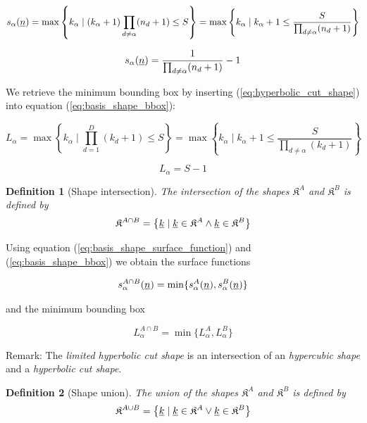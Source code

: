 \documentclass{article}
\newtheorem{definition}{Definition}
\begin{document}
\[
  s_{\alpha}(\underline{n})=
  \max\left\{k_{\alpha} \mid (k_{\alpha}+1)\prod_{d \neq \alpha} (n_d+1) \leq S \right\} =
  \max\left\{k_{\alpha} \mid k_{\alpha}+1 \leq \frac{S}{\prod_{d \neq \alpha}(n_d+1)}\right\}
\]

\begin{equation}
s_{\alpha}(\underline{n})=\frac{1}{\prod_{d \neq \alpha} (n_d+1)}-1
\end{equation}

We retrieve the minimum bounding box by inserting (\ref{eq:hyperbolic_cut_shape}) into
equation (\ref{eq:basis_shape_bbox}):

\[
  L_{\alpha}=\max\left\{k_{\alpha} \mid \prod_{d=1}^D(k_d+1) \leq S\right\} =
  \max\left\{k_{\alpha} \mid k_{\alpha}+1 \leq \frac{S}{\prod_{d \neq \alpha}(k_d+1)}\right\}
\]

\begin{equation}
L_{\alpha}=S-1
\end{equation}

\begin{definition}[Shape intersection]
  The intersection of the shapes \(\mathfrak{K}^{A}\) and \(\mathfrak{K}^{B}\) is defined by
  \begin{equation}
    \label{eq:basis_shape_intersection}
    \mathfrak{K}^{A \cap B}=\left\{\underline{k} \;|\; \underline{k} \in \mathfrak{K}^A \land
      \underline{k} \in \mathfrak{K}^B
    \right\}
  \end{equation}
\end{definition}

Using equation (\ref{eq:basis_shape_surface_function}) and (\ref{eq:basis_shape_bbox})
we obtain the surface functions

\begin{equation}
  s_{\alpha}^{A \cap B}(\underline{n}) = \min\{s_{\alpha}^A(\underline{n}), s_{\alpha}^B(\underline{n})\}
\end{equation}

and the minimum bounding box

\begin{equation}
  L_{\alpha}^{A \cap B} = \min\{L_{\alpha}^{A}, L_{\alpha}^{B}\}
\end{equation}

Remark: The \emph{limited hyperbolic cut shape} is an intersection of an
\emph{hypercubic shape} and a \emph{hyperbolic cut shape}.

\begin{definition}[Shape union]
  The union of the shapes \(\mathfrak{K}^{A}\) and \(\mathfrak{K}^{B}\) is defined by
  \begin{equation}
    \label{eq:basis_shape_union}
    \mathfrak{K}^{A \cup B}=\left\{\underline{k} \;|\; \underline{k} \in \mathfrak{K}^A \lor
      \underline{k} \in \mathfrak{K}^B
    \right\}
  \end{equation}
\end{definition}
\end{document}
